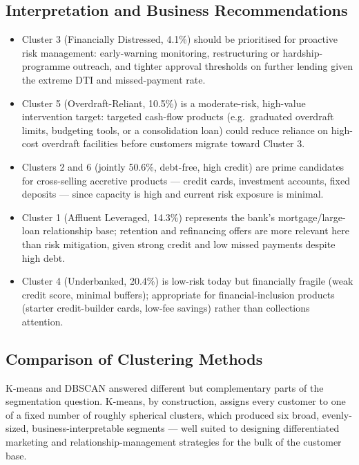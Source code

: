 \documentclass[11pt]{article}
\begin{document}
\subsection{Interpretation and Business Recommendations}

\begin{itemize}[leftmargin=1.4em]
  \item Cluster 3 (Financially Distressed, 4.1\%) should be prioritised for proactive risk management: early-warning monitoring, restructuring or hardship-programme outreach, and tighter approval thresholds on further lending given the extreme DTI and missed-payment rate.
  \item Cluster 5 (Overdraft-Reliant, 10.5\%) is a moderate-risk, high-value intervention target: targeted cash-flow products (e.g.\ graduated overdraft limits, budgeting tools, or a consolidation loan) could reduce reliance on high-cost overdraft facilities before customers migrate toward Cluster 3.
  \item Clusters 2 and 6 (jointly 50.6\%, debt-free, high credit) are prime candidates for cross-selling accretive products --- credit cards, investment accounts, fixed deposits --- since capacity is high and current risk exposure is minimal.
  \item Cluster 1 (Affluent Leveraged, 14.3\%) represents the bank's mortgage/large-loan relationship base; retention and refinancing offers are more relevant here than risk mitigation, given strong credit and low missed payments despite high debt.
  \item Cluster 4 (Underbanked, 20.4\%) is low-risk today but financially fragile (weak credit score, minimal buffers); appropriate for financial-inclusion products (starter credit-builder cards, low-fee savings) rather than collections attention.
\end{itemize}

\subsection{Comparison of Clustering Methods}

K-means and DBSCAN answered different but complementary parts of the segmentation question. K-means, by construction, assigns every customer to one of a fixed number of roughly spherical clusters, which produced six broad, evenly-sized, business-interpretable segments --- well suited to designing differentiated marketing and relationship-management strategies for the bulk of the customer base.
\end{document}
